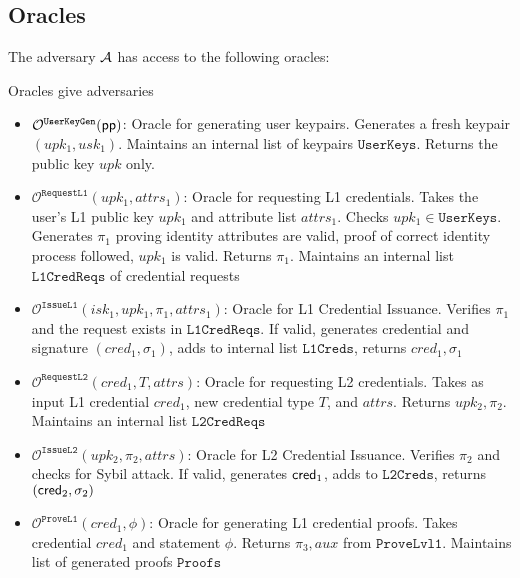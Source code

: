 \subsection{Oracles}
The adversary $\mathcal{A}$ has access to the following oracles:

Oracles give adversaries 






\begin{itemize}
    \item $\mathcal{O}^{\texttt{UserKeyGen}}(\mathsf{pp})$: Oracle for generating user keypairs. Generates a fresh keypair $(upk_1, usk_1)$. Maintains an internal list of keypairs $\texttt{UserKeys}$. Returns the public key $upk$ only.
    
    \item $\mathcal{O}^{\texttt{RequestL1}}(upk_1, attrs_1)$: Oracle for requesting L1 credentials. Takes the user's L1 public key $upk_1$ and attribute list $attrs_1$. Checks $upk_1 \in \texttt{UserKeys}$. Generates $\pi_1$ proving identity attributes are valid, proof of correct identity process followed, $upk_1$ is valid. Returns $\pi_1$. Maintains an internal list $\texttt{L1CredReqs}$ of credential requests

    \item $\mathcal{O}^{\texttt{IssueL1}}(isk_1, upk_1, \pi_1, attrs_1)$: Oracle for L1 Credential Issuance. Verifies $\pi_1$ and the request exists in $\texttt{L1CredReqs}$. If valid, generates credential and signature $(cred_1, \sigma_1)$, adds to internal list $\texttt{L1Creds}$, returns $cred_1, \sigma_1$

    \item $\mathcal{O}^{\texttt{RequestL2}}(cred_1, T, attrs)$: Oracle for requesting L2 credentials. Takes as input L1 credential $cred_1$, new credential type $T$, and $attrs$. Returns $upk_2, \pi_2$. Maintains an internal list $\texttt{L2CredReqs}$

    \item $\mathcal{O}^{\texttt{IssueL2}}(upk_2, \pi_2, attrs)$: Oracle for L2 Credential Issuance. Verifies $\pi_2$ and checks for Sybil attack. If valid, generates $\mathsf{cred}_1$, adds to $\texttt{L2Creds}$, returns $(\mathsf{cred}_2, \sigma_2)$

    \item $\mathcal{O}^{\texttt{ProveL1}}(cred_1, \phi)$: Oracle for generating L1 credential proofs. Takes credential $cred_1$ and statement $\phi$. Returns $\pi_3, aux$ from $\texttt{ProveLvl1}$. Maintains list of generated proofs $\texttt{Proofs}$
    

\end{itemize}
